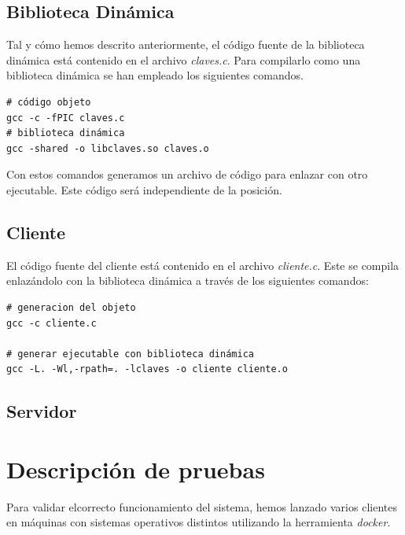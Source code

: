 \documentclass[]{article}
\begin{document}
\subsection{Biblioteca Dinámica}
\label{subsec:biblioteca}
Tal y cómo hemos descrito anteriormente, el código fuente de la biblioteca dinámica está contenido en el archivo \textit{claves.c}. Para compilarlo como una biblioteca dinámica se han empleado los siguientes comandos.

\begin{center}
\begin{lstlisting}[caption=Compiación de biblioteca dinámica]
# código objeto
gcc -c -fPIC claves.c
# biblioteca dinámica
gcc -shared -o libclaves.so claves.o
\end{lstlisting}
\end{center}

Con estos comandos generamos un archivo de código  para enlazar con otro ejecutable. Este código será independiente de la posición. 

\subsection{Cliente}
\label{subsec:cliente}
El código fuente del cliente está contenido en el archivo \textit{cliente.c}. Este se compila enlazándolo con la biblioteca dinámica a través de los siguientes comandos: 

\begin{center}
\begin{lstlisting}[caption=Compiación de biblioteca dinámica]
# generacion del objeto
gcc -c cliente.c

# generar ejecutable con biblioteca dinámica
gcc -L. -Wl,-rpath=. -lclaves -o cliente cliente.o
\end{lstlisting}
\end{center}

\subsection{Servidor}
\label{subsec:servidor}


\section{Descripción de pruebas}
\label{sec:descripcion_de_pruebas}
Para validar elcorrecto funcionamiento del sistema, hemos lanzado varios clientes en máquinas con sistemas operativos distintos utilizando la herramienta \textit{docker}.
\end{document}
